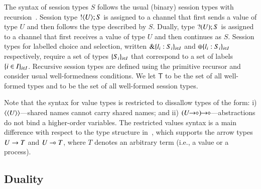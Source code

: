 The syntax of session types $S$ follows the usual (binary) session
types with recursion~\cite{honda.vasconcelos.kubo:language-primitives,GH05}.
Session type $! \langle U \rangle ; S$ is assigned to a channel that first sends a 
value of type $U$ and then follows
the type described by $S$.
Dually, type $? (U) ; S$ is assigned to a channel  
that first receives a value of type $U$ and then continues as $S$. 
Session types for labelled choice and selection, 
written $\& \{l_i:S_i\}_{i \in I}$ and $\oplus \{l_i:S_i\}_{i \in I}$ respectively,
require a set of types $\{S_i\}_{i \in I}$ that correspond to a set of
labels $\{i \in I\}_{i \in I}$. 
Recursive session types are defined using the primitive recursor
and consider usual well-formedness conditions.
We let $\mathsf{T}$ to be the set of all well-formed types and
\ST to be the set of all well-formed session types.


Note that the syntax for value types is restricted
to dissallow types of the form:
i) $\langle \langle U \rangle \rangle$---shared names
cannot carry shared names;
and ii) $\shot{(\shot{U})}$---abstractions do not
bind a higher-order variables.
The restricted values syntax is a main difference with respect to
the type structure  in~\cite{tlca07}, which 
supports the arrow types $U \rightarrow T$ and 
$U \multimap T$, where $T$ denotes an arbitrary term 
(i.e., a value or a process).


\subsection{Duality}

